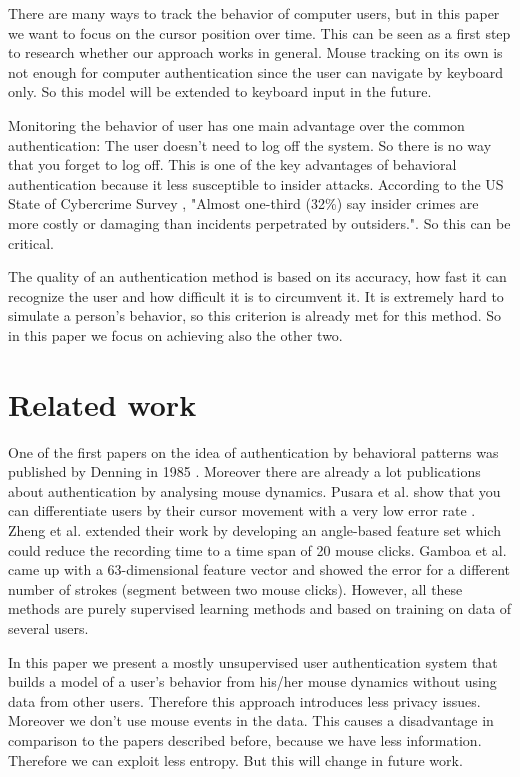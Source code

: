 \documentclass[conference]{IEEEtran}
\begin{document}
There are many ways to track the behavior of computer users, but in this paper we want to focus on the cursor position over time. This can be seen as a first step to research whether our approach works in general. Mouse tracking on its own is not enough for computer authentication since the user can navigate by keyboard only. So this model will be extended to keyboard input in the future.

Monitoring the behavior of user has one main advantage over the common authentication: The user doesn't need to log off the system. So there is no way that you forget to log off. This is one of the key advantages of behavioral authentication because it less susceptible to insider attacks. According to the US State of Cybercrime Survey \cite{us2014us}, "Almost one-third (32\%) say insider crimes are more costly or damaging than incidents perpetrated by outsiders.". So this can be critical.

The quality of an authentication method is based on its accuracy, how fast it can recognize the user and how difficult it is to circumvent it. It is extremely hard to simulate a person's behavior, so this criterion is already met for this method. So in this paper we focus on achieving also the other two.


\section{Related work}

One of the first papers on the idea of authentication by behavioral patterns was published by Denning in 1985 \cite{denning1985requirements}. Moreover there are already a lot publications about authentication by analysing mouse dynamics. Pusara et al. show that you can differentiate users by their cursor movement with a very low error rate \cite{pusara2004user}. Zheng et al. extended their work by developing an angle-based feature set which could reduce the recording time to a time span of 20 mouse clicks. \cite{zheng2011efficient} Gamboa et al. came up with a 63-dimensional feature vector and showed the error for a different number of strokes (segment between two mouse clicks). \cite{gamboa2003identity} However, all these methods are purely supervised learning methods and based on training on data of several users.

In this paper we present a mostly unsupervised user authentication system that builds a model of a user’s behavior from his/her mouse dynamics without using data from other users. Therefore this approach introduces less privacy issues. Moreover we don't use mouse events in the data. This causes a disadvantage in comparison to the papers described before, because we have less information. Therefore we can exploit less entropy. But this will change in future work.
\end{document}
